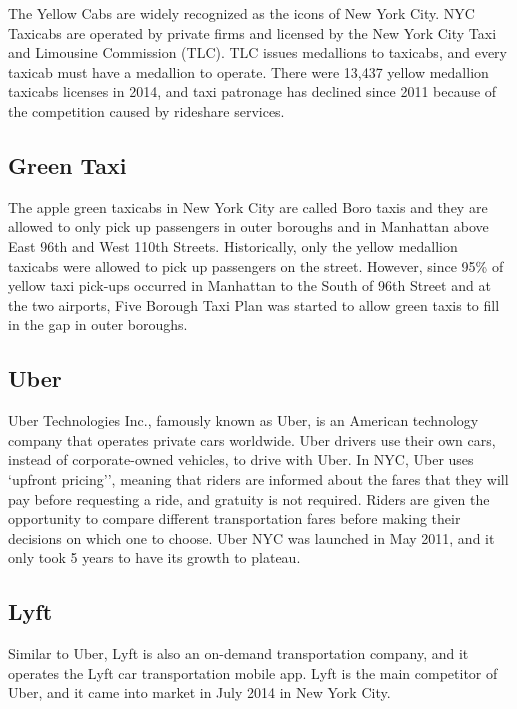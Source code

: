 \documentclass[12pt,twoside]{reedthesis}
\theoremstyle{definition}
\theoremstyle{definition}
\theoremstyle{definition}
\theoremstyle{remark}
\begin{document}
The Yellow Cabs are widely recognized as the icons of New York City. NYC
Taxicabs are operated by private firms and licensed by the New York City
Taxi and Limousine Commission (TLC). TLC issues medallions to taxicabs,
and every taxicab must have a medallion to operate. There were 13,437
yellow medallion taxicabs licenses in 2014, and taxi patronage has
declined since 2011 because of the competition caused by rideshare
services.

\subsection{Green Taxi}\label{green-taxi}

The apple green taxicabs in New York City are called Boro taxis and they
are allowed to only pick up passengers in outer boroughs and in
Manhattan above East 96th and West 110th Streets. Historically, only the
yellow medallion taxicabs were allowed to pick up passengers on the
street. However, since 95\% of yellow taxi pick-ups occurred in
Manhattan to the South of 96th Street and at the two airports, Five
Borough Taxi Plan was started to allow green taxis to fill in the gap in
outer boroughs.

\subsection{Uber}\label{uber}

Uber Technologies Inc., famously known as Uber, is an American
technology company that operates private cars worldwide. Uber drivers
use their own cars, instead of corporate-owned vehicles, to drive with
Uber. In NYC, Uber uses `upfront pricing'', meaning that riders are
informed about the fares that they will pay before requesting a ride,
and gratuity is not required. Riders are given the opportunity to
compare different transportation fares before making their decisions on
which one to choose. Uber NYC was launched in May 2011, and it only took
5 years to have its growth to plateau.

\subsection{Lyft}\label{lyft}

Similar to Uber, Lyft is also an on-demand transportation company, and
it operates the Lyft car transportation mobile app. Lyft is the main
competitor of Uber, and it came into market in July 2014 in New York
City.
\end{document}
